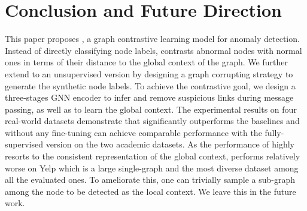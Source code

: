 \section{Conclusion and Future Direction}
\label{sec:con} 

This paper proposes \model, a %
graph contrastive learning model
for anomaly detection. 
Instead of directly classifying node labels, \smodel contrasts abnormal nodes with normal ones in terms of their distance to the global context of the graph. We further extend \smodel to an unsupervised version by designing a graph corrupting strategy to generate the synthetic node labels. 
To achieve the contrastive goal, we design a three-stages GNN encoder to infer and remove suspicious links during message passing, as well as to learn the global context.
The experimental results on four real-world datasets demonstrate that \smodel significantly outperforms the baselines and \spmodel without any fine-tuning can achieve comparable performance with the fully-supervised version on the two academic datasets. 
As the performance of \smodel highly resorts to the consistent representation of the global context, \smodel performs relatively worse on Yelp which is a large single-graph and the most diverse dataset among all the evaluated ones. To ameliorate this, one can trivially sample a sub-graph among the node to be detected as the local context. We leave this in the future work.


